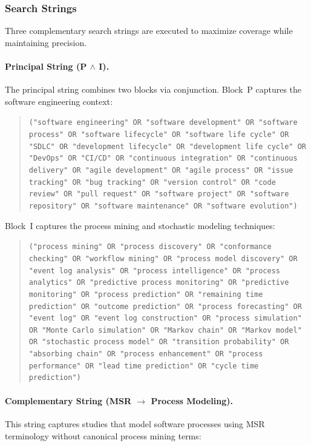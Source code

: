 \subsubsection{Search Strings}

Three complementary search strings are executed to maximize coverage while maintaining precision.

\paragraph{Principal String (P $\wedge$ I).} The principal string combines two blocks via conjunction. Block~P captures the software engineering context:

\begin{quote}
\small
\texttt{("software engineering" OR "software development" OR "software process" OR "software lifecycle" OR "software life cycle" OR "SDLC" OR "development lifecycle" OR "development life cycle" OR "DevOps" OR "CI/CD" OR "continuous integration" OR "continuous delivery" OR "agile development" OR "agile process" OR "issue tracking" OR "bug tracking" OR "version control" OR "code review" OR "pull request" OR "software project" OR "software repository" OR "software maintenance" OR "software evolution")}
\end{quote}

Block~I captures the process mining and stochastic modeling techniques:

\begin{quote}
\small
\texttt{("process mining" OR "process discovery" OR "conformance checking" OR "workflow mining" OR "process model discovery" OR "event log analysis" OR "process intelligence" OR "process analytics" OR "predictive process monitoring" OR "predictive monitoring" OR "process prediction" OR "remaining time prediction" OR "outcome prediction" OR "process forecasting" OR "event log" OR "event log construction" OR "process simulation" OR "Monte Carlo simulation" OR "Markov chain" OR "Markov model" OR "stochastic process model" OR "transition probability" OR "absorbing chain" OR "process enhancement" OR "process performance" OR "lead time prediction" OR "cycle time prediction")}
\end{quote}

\paragraph{Complementary String (MSR $\rightarrow$ Process Modeling).} This string captures studies that model software processes using MSR terminology without canonical process mining terms:

